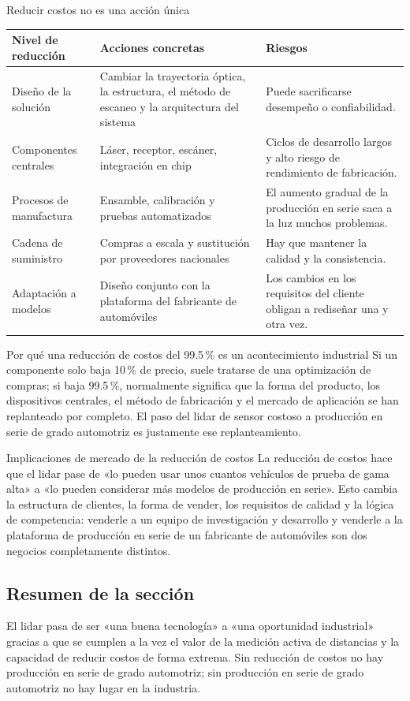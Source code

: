 \begin{knowledgebox}{Reducir costos no es una acción única}
\begin{tabularx}{\textwidth}{p{}p{}X}
\toprule
Nivel de reducción & Acciones concretas & Riesgos \\
\midrule
Diseño de la solución & Cambiar la trayectoria óptica, la estructura, el método de escaneo y la arquitectura del sistema & Puede sacrificarse desempeño o confiabilidad. \\
Componentes centrales & Láser, receptor, escáner, integración en chip & Ciclos de desarrollo largos y alto riesgo de rendimiento de fabricación. \\
Procesos de manufactura & Ensamble, calibración y pruebas automatizados & El aumento gradual de la producción en serie saca a la luz muchos problemas. \\
Cadena de suministro & Compras a escala y sustitución por proveedores nacionales & Hay que mantener la calidad y la consistencia. \\
Adaptación a modelos & Diseño conjunto con la plataforma del fabricante de automóviles & Los cambios en los requisitos del cliente obligan a rediseñar una y otra vez. \\
\bottomrule
\end{tabularx}
\end{knowledgebox}

\begin{importantbox}{Por qué una reducción de costos del 99.5\,\% es un acontecimiento industrial}
Si un componente solo baja 10\,\% de precio, suele tratarse de una optimización de compras; si baja 99.5\,\%, normalmente significa que la forma del producto, los dispositivos centrales, el método de fabricación y el mercado de aplicación se han replanteado por completo. El paso del lidar de sensor costoso a producción en serie de grado automotriz es justamente ese replanteamiento.
\end{importantbox}

\begin{knowledgebox}{Implicaciones de mercado de la reducción de costos}
La reducción de costos hace que el lidar pase de «lo pueden usar unos cuantos vehículos de prueba de gama alta» a «lo pueden considerar más modelos de producción en serie». Esto cambia la estructura de clientes, la forma de vender, los requisitos de calidad y la lógica de competencia: venderle a un equipo de investigación y desarrollo y venderle a la plataforma de producción en serie de un fabricante de automóviles son dos negocios completamente distintos.
\end{knowledgebox}

\subsection{Resumen de la sección}

El lidar pasa de ser «una buena tecnología» a «una oportunidad industrial» gracias a que se cumplen a la vez el valor de la medición activa de distancias y la capacidad de reducir costos de forma extrema. Sin reducción de costos no hay producción en serie de grado automotriz; sin producción en serie de grado automotriz no hay lugar en la industria.
